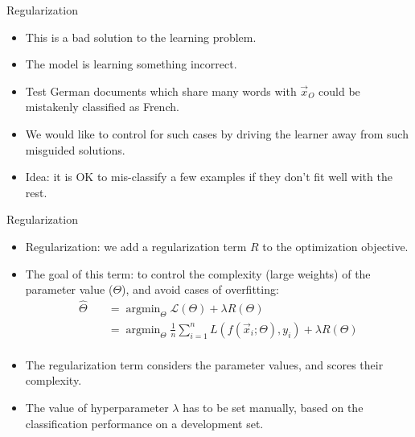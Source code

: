 \documentclass[handout]{beamer}
\begin{document}
\begin{frame}{Regularization}
\begin{scriptsize}
\begin{itemize}
  \item This is a bad solution to the learning problem.
 \item The model is learning something incorrect.
 \item Test German documents which share many words with $\vec{x}_O$ could be mistakenly classified as French. 
 \item We would like to control for such cases by driving the learner away from such misguided solutions.
 \item Idea: it is OK to mis-classify a few examples if they don't fit well with the rest.
 
\end{itemize}
\end{scriptsize}

\end{frame}



\begin{frame}{Regularization}
\begin{scriptsize}
\begin{itemize}
  \item Regularization: we add a regularization term $R$ to the optimization objective.
  \item  The goal of this term: to control the complexity (large weights) of the parameter value ($\Theta$), and avoid cases of overfitting:
\begin{equation}
 \begin{split}
  \hat{\Theta} \quad & =  \operatorname{argmin}_{\Theta} \mathcal{L}(\Theta) + \lambda R(\Theta) \\
     \quad & =  \operatorname{argmin}_{\Theta} \frac{1}{n} \sum_{i=1}^n L(f(\vec{x}_i;\Theta), y_i) + \lambda R(\Theta) \\
 \end{split}
\end{equation}  
\item The regularization term considers the parameter values, and scores their complexity.  
\item The value of hyperparameter $\lambda$ has to be set manually, based on the classification performance on a development set.   
 
\end{itemize}
\end{scriptsize}

\end{frame}
\end{document}
